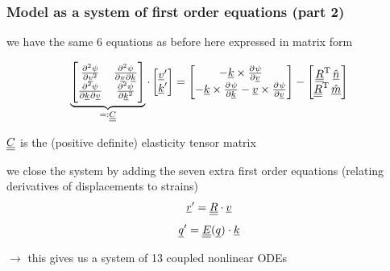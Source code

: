 \begin{frame}
  \frametitle{Model as a system of first order equations (part 2)}

  we have the same 6 equations as before here expressed in matrix form
  
  \begin{displaymath}
    \underbrace{
    \begin{bmatrix}
      \pd[2]{\psi}{\underline{v}} &
      \md{\psi}{2}{\underline{v}}{}{\underline{k}}{} \\
      \md{\psi}{2}{\underline{k}}{}{\underline{v}}{} &
      \pd[2]{\psi}{\underline{k}}
    \end{bmatrix}
    }_{=: \doubleunderline{C}}
    \cdot
    \begin{bmatrix}
      \underline{v}^{\prime} \\
      \underline{k}^{\prime}
    \end{bmatrix} =
    \begin{bmatrix}
      -\underline{k} \times \pd{\psi}{\underline{v}} \\
      -\underline{k} \times \pd{\psi}{\underline{k}}
      -\underline{v} \times \pd{\psi}{\underline{v}}
    \end{bmatrix} -
    \begin{bmatrix}
      \doubleunderline{R}^{\mathrm{T}} \, \underline{\hat{n}} \\
      \doubleunderline{R}^{\mathrm{T}} \, \underline{\hat{m}}
    \end{bmatrix}
  \end{displaymath}
  
  $\underline{\underline{C}}$ is the (positive definite) elasticity tensor matrix
  
  \vspace{1em}
  we close the system by adding the seven extra first order equations \newline
  (relating derivatives of displacements to strains)
  \begin{displaymath}
    \underline{r}^{\prime} = \underline{\underline{R}} \cdot \underline{v}
  \end{displaymath}
  \begin{displaymath}
    \underline{q}^{\prime} = \underline{\underline{E}}(\underline{q}) \cdot \underline{k}
  \end{displaymath}
  
  \vspace{1em}
  $\rightarrow$ this gives us a system of 13 coupled nonlinear ODEs
\end{frame}


